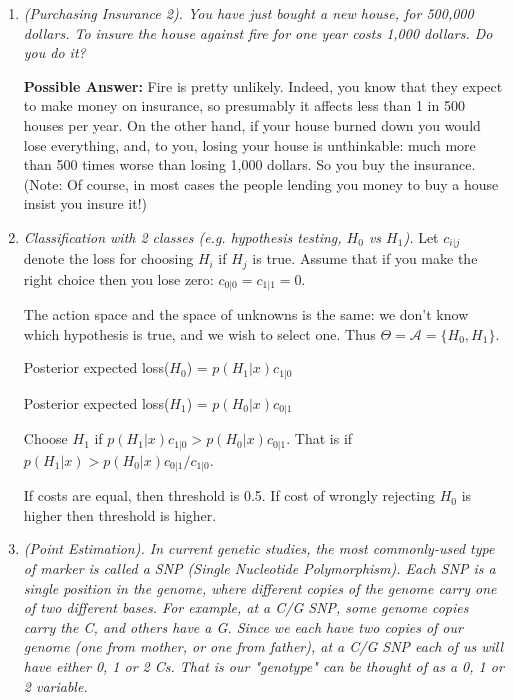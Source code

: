 \documentclass[12pt]{article}
\def\A{\mathcal A}
\begin{document}
\begin{enumerate}
{\bf Possible Answer: } You know that they must be expecting to make money on the warranty, so you figure
that it is used by fewer than one person in ten. If you buy the warranty, that will cost you 30 dollars.
If you do not buy the warranty, then if your ipod breaks during years 2 or 3 you will have to replace
it. But costs are dropping, and things always get better, so you will presumably spend less than 300
to replace it for something better. So you figure your utility for buying it is -30, and your
utility for not buying it is more than (-300)*0.1 = -30. So you don't buy it.

\medskip

\item {\it (Purchasing Insurance 2). You have just bought a new house, for 500,000 dollars.
To insure the house against fire for one year costs 1,000 dollars. Do you do it?}

{\bf Possible Answer:}  Fire is pretty unlikely. Indeed, you know that they expect to make
money on insurance, so presumably it affects less than 1 in 500 houses per year. On the other
hand, if your house burned down you would lose everything, and, to you, 
losing your house is unthinkable: much more than 500 times worse than losing 1,000 dollars.
So you buy the insurance. (Note: Of course, in most cases the people lending you money to buy a house
insist you insure it!)

\item {\it Classification with 2 classes (e.g. hypothesis testing, $H_0$ vs $H_1$).} Let $c_{i|j}$ denote the loss for choosing $H_i$ if $H_j$ is true.
Assume that if you make the right choice then you lose zero:
$c_{0|0}=c_{1|1}=0$.

The action space and the space of unknowns is the same: we
don't know which hypothesis is true, and we wish to select one.
 Thus $\Theta=\A=\{H_0,H_1\}$.

Posterior expected loss($H_0$) = $p(H_1 | x) c_{1|0}$

Posterior expected loss($H_1$) = $p(H_0 | x) c_{0|1}$

Choose $H_1$ if $p(H_1 | x) c_{1|0} > p(H_0 | x) c_{0|1}$.
That is if $p(H_1 | x) > p(H_0 | x) c_{0|1}/c_{1|0}$.

If costs are equal, then threshold is 0.5.
If cost of wrongly rejecting $H_0$ is higher 
then threshold is higher.


\item {\it (Point Estimation). In current genetic studies, the most commonly-used type of marker is called a SNP (Single Nucleotide Polymorphism). Each SNP is a single position in the genome, where different copies of the genome carry one of two different bases. For example, at a C/G SNP, some genome copies carry the C, and others have a G. Since we each have two copies of our genome (one from mother,
or one from father), at a C/G SNP each of us will have either 0, 1 or 2 Cs. That is our "genotype" can be thought of as a 0, 1 or 2 variable.

}
\end{enumerate}
\end{document}
